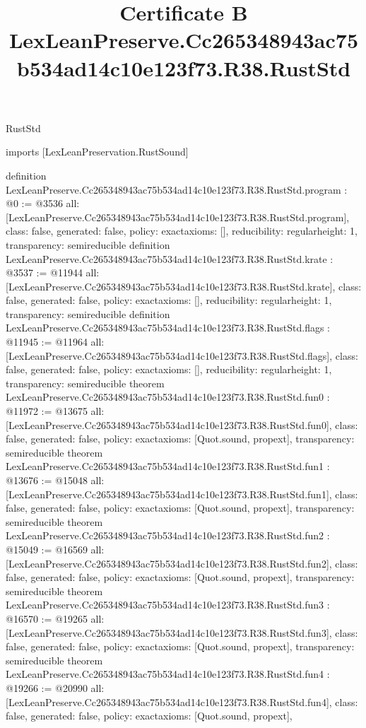 \begin{lexlean}{RustStd}
\title{Certificate B LexLeanPreserve.Cc265348943ac75b534ad14c10e123f73.R38.RustStd}
\begin{coremodule}
imports [LexLeanPreservation.RustSound]

definition LexLeanPreserve.Cc265348943ac75b534ad14c10e123f73.R38.RustStd.program : @0 := @3536 {
  all: [LexLeanPreserve.Cc265348943ac75b534ad14c10e123f73.R38.RustStd.program],
  class: false,
  generated: false,
  policy: exact{axioms: []},
  reducibility: regular{height: 1},
  transparency: semireducible
}
definition LexLeanPreserve.Cc265348943ac75b534ad14c10e123f73.R38.RustStd.krate : @3537 := @11944 {
  all: [LexLeanPreserve.Cc265348943ac75b534ad14c10e123f73.R38.RustStd.krate],
  class: false,
  generated: false,
  policy: exact{axioms: []},
  reducibility: regular{height: 1},
  transparency: semireducible
}
definition LexLeanPreserve.Cc265348943ac75b534ad14c10e123f73.R38.RustStd.flags : @11945 := @11964 {
  all: [LexLeanPreserve.Cc265348943ac75b534ad14c10e123f73.R38.RustStd.flags],
  class: false,
  generated: false,
  policy: exact{axioms: []},
  reducibility: regular{height: 1},
  transparency: semireducible
}
theorem LexLeanPreserve.Cc265348943ac75b534ad14c10e123f73.R38.RustStd.fun0 : @11972 := @13675 {
  all: [LexLeanPreserve.Cc265348943ac75b534ad14c10e123f73.R38.RustStd.fun0],
  class: false,
  generated: false,
  policy: exact{axioms: [Quot.sound, propext]},
  transparency: semireducible
}
theorem LexLeanPreserve.Cc265348943ac75b534ad14c10e123f73.R38.RustStd.fun1 : @13676 := @15048 {
  all: [LexLeanPreserve.Cc265348943ac75b534ad14c10e123f73.R38.RustStd.fun1],
  class: false,
  generated: false,
  policy: exact{axioms: [Quot.sound, propext]},
  transparency: semireducible
}
theorem LexLeanPreserve.Cc265348943ac75b534ad14c10e123f73.R38.RustStd.fun2 : @15049 := @16569 {
  all: [LexLeanPreserve.Cc265348943ac75b534ad14c10e123f73.R38.RustStd.fun2],
  class: false,
  generated: false,
  policy: exact{axioms: [Quot.sound, propext]},
  transparency: semireducible
}
theorem LexLeanPreserve.Cc265348943ac75b534ad14c10e123f73.R38.RustStd.fun3 : @16570 := @19265 {
  all: [LexLeanPreserve.Cc265348943ac75b534ad14c10e123f73.R38.RustStd.fun3],
  class: false,
  generated: false,
  policy: exact{axioms: [Quot.sound, propext]},
  transparency: semireducible
}
theorem LexLeanPreserve.Cc265348943ac75b534ad14c10e123f73.R38.RustStd.fun4 : @19266 := @20990 {
  all: [LexLeanPreserve.Cc265348943ac75b534ad14c10e123f73.R38.RustStd.fun4],
  class: false,
  generated: false,
  policy: exact{axioms: [Quot.sound, propext]},
}
\end{coremodule}
\end{lexlean}

